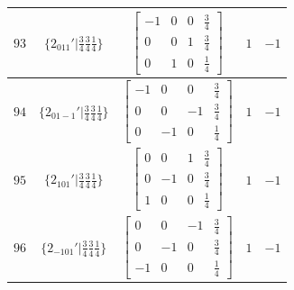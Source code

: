 \documentclass[fleqn,8pt]{jsarticle}
\begin{document}
\begin{longtable}{ccccc}
$ 93 $ & $ \{2{}_{011}{}'|\frac{3}{4} \frac{3}{4} \frac{1}{4}\} $ & $ \begin{bmatrix} -1 & 0 & 0 & \frac{3}{4} \\ 0 & 0 & 1 & \frac{3}{4} \\ 0 & 1 & 0 & \frac{1}{4} \end{bmatrix} $ & $ 1 $ & $ -1 $ \\ \hline
$ 94 $ & $ \{2{}_{01-1}{}'|\frac{3}{4} \frac{3}{4} \frac{1}{4}\} $ & $ \begin{bmatrix} -1 & 0 & 0 & \frac{3}{4} \\ 0 & 0 & -1 & \frac{3}{4} \\ 0 & -1 & 0 & \frac{1}{4} \end{bmatrix} $ & $ 1 $ & $ -1 $ \\ \hline
$ 95 $ & $ \{2{}_{101}{}'|\frac{3}{4} \frac{3}{4} \frac{1}{4}\} $ & $ \begin{bmatrix} 0 & 0 & 1 & \frac{3}{4} \\ 0 & -1 & 0 & \frac{3}{4} \\ 1 & 0 & 0 & \frac{1}{4} \end{bmatrix} $ & $ 1 $ & $ -1 $ \\ \hline
$ 96 $ & $ \{2{}_{-101}{}'|\frac{3}{4} \frac{3}{4} \frac{1}{4}\} $ & $ \begin{bmatrix} 0 & 0 & -1 & \frac{3}{4} \\ 0 & -1 & 0 & \frac{3}{4} \\ -1 & 0 & 0 & \frac{1}{4} \end{bmatrix} $ & $ 1 $ & $ -1 $ \\
\end{longtable}
\end{document}
